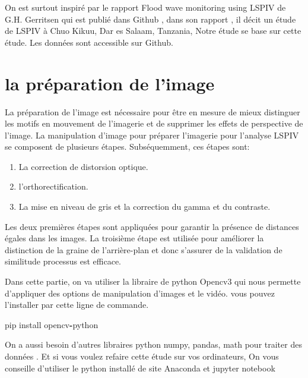 \documentclass[
]{article}
\newenvironment{Shaded}{\begin{snugshade}}{\end{snugshade}}
\newcommand{\NormalTok}[1]{#1}
\newcommand{\OperatorTok}[1]{\textcolor[rgb]{0.81,0.36,0.00}{\textbf{#1}}}
\begin{document}
On est surtout inspiré par le rapport Flood wave monitoring using LSPIV de G.H. Gerritsen qui est publié dans Github , dans son rapport , il décit un étude de LSPIV à Chuo Kikuu, Dar es Salaam, Tanzania, Notre étude se base sur cette étude. Les données sont accessible sur Github.

\newpage

\hypertarget{ip}{%
\section*{la préparation de l'image}\label{ip}}

La préparation de l'image est nécessaire pour être en mesure de mieux distinguer les motifs en mouvement de l'imagerie et de supprimer les effets de perspective de l'image. La manipulation d'image pour préparer l'imagerie pour l'analyse LSPIV se composent de plusieurs étapes. Subséquemment, ces étapes sont:

\begin{enumerate}
\def\labelenumi{(\arabic{enumi})}
\item
  La correction de distorsion optique.
\item
  l'orthorectification.
\item
  La mise en niveau de gris et la correction du gamma et du contraste.
\end{enumerate}

Les deux premières étapes
sont appliquées pour garantir la présence de distances égales dans les images.
La troisième étape est utilisée pour améliorer la distinction de la graine de
l'arrière-plan et donc s'assurer de la validation de similitude
processus est efficace.

Dans cette partie, on va utiliser la libraire de python Opencv3\citep{noauthor_opencv_2015} qui nous permette d'appliquer des options de manipulation d'images et le vidéo. vous pouvez l'installer par cette ligne de commande.

\begin{Shaded}
\begin{Highlighting}[]
\NormalTok{pip install opencv}\OperatorTok{{-}}\NormalTok{python}
\end{Highlighting}
\end{Shaded}

On a aussi besoin d'autres libraires python numpy, pandas, math pour traiter des données . Et si vous voulez refaire cette étude sur vos ordinateurs, On vous conseille d'utiliser le python installé de site Anaconda et jupyter notebook
\end{document}
